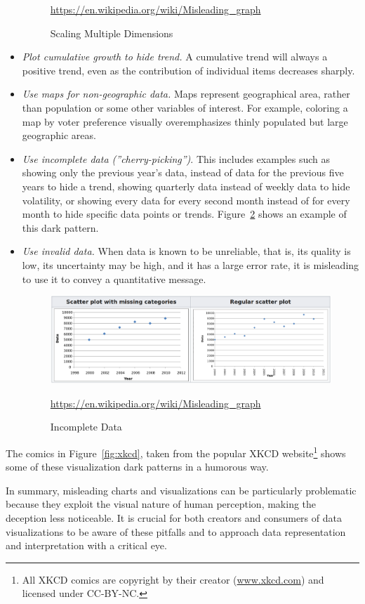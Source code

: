 \begin{itemize}
\begin{figure}
\scriptsize\url{https://en.wikipedia.org/wiki/Misleading_graph}
\caption{Scaling Multiple Dimensions}
\label{fig:imagesgraphs}
\end{figure}
	\item \emph{Plot cumulative growth to hide trend.} A cumulative trend will always a positive trend, even as the contribution of individual items decreases sharply.
	\item \emph{Use maps for non-geographic data.} Maps represent geographical area, rather than population or some other variables of interest. For example, coloring a map by voter preference visually overemphasizes thinly populated but large geographic areas.
	\item \emph{Use incomplete data (''cherry-picking'')}. This includes examples such as showing only the previous year's data, instead of data for the previous five years to hide a trend, showing quarterly data instead of weekly data to hide volatility, or showing every data for every second month instead of for every month to hide specific data points or trends. Figure~\ref{fig:omitted} shows an example of this dark pattern.
	\item \emph{Use invalid data.} When data is known to be unreliable, that is, its quality is low, its uncertainty may be high, and it has a large error rate, it is misleading to use it to convey a quantitative message. 
\begin{figure}
\centering
\includegraphics[width=\textwidth]{screen5.png}

\scriptsize\url{https://en.wikipedia.org/wiki/Misleading_graph}
\caption{Incomplete Data}
\label{fig:omitted}
\end{figure}

\end{itemize}	

The comics in Figure~\ref{fig:xkcd}, taken from the popular XKCD website\footnote{All XKCD comics are copyright by their creator (\url{www.xkcd.com}) and licensed under CC-BY-NC.} shows some of these visualization dark patterns in a humorous way. 

In summary, misleading charts and visualizations can be particularly problematic because they exploit the visual nature of human perception, making the deception less noticeable. It is crucial for both creators and consumers of data visualizations to be aware of these pitfalls and to approach data representation and interpretation with a critical eye.

